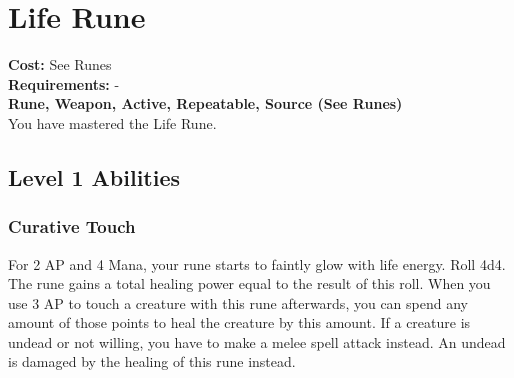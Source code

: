 \twocolumn
\section{Life Rune}\label{rune:life}
\textbf{Cost:} See Runes\\
\textbf{Requirements:} -\\
\textbf{Rune, Weapon, Active, Repeatable, Source (See Runes)}\\
You have mastered the Life Rune.

\subsection{Level 1 Abilities}

\subsubsection{Curative Touch}
For 2 AP and 4 Mana, your rune starts to faintly glow with life energy.
Roll 4d4.
The rune gains a total healing power equal to the result of this roll.
When you use 3 AP to touch a creature with this rune afterwards, you can spend any amount of those points to heal the creature by this amount.
If a creature is undead or not willing, you have to make a melee spell attack instead.
An undead is damaged by the healing of this rune instead.
